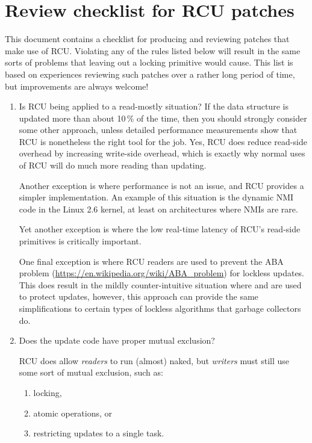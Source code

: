 
\section{Review checklist for RCU patches}

This document contains a checklist for producing and reviewing patches
that make use of RCU\@.
Violating any of the rules listed below will
result in the same sorts of problems that leaving out a locking primitive
would cause.
This list is based on experiences reviewing such patches
over a rather long period of time, but improvements are always welcome!

\begin{enumerate}[start=0]
\item	Is RCU being applied to a read-mostly situation?
	If the data
	structure is updated more than about 10\,\% of the time, then you
	should strongly consider some other approach, unless detailed
	performance measurements show that RCU is nonetheless the right
	tool for the job.
	Yes, RCU does reduce read-side overhead by
	increasing write-side overhead, which is exactly why normal uses
	of RCU will do much more reading than updating.

	Another exception is where performance is not an issue, and RCU
	provides a simpler implementation.
	An example of this situation
	is the dynamic NMI code in the Linux 2.6 kernel, at least on
	architectures where NMIs are rare.

	Yet another exception is where the low real-time latency of RCU's
	read-side primitives is critically important.

	One final exception is where RCU readers are used to prevent
	the ABA problem (\url{https://en.wikipedia.org/wiki/ABA_problem})
	for lockless updates.
	This does result in the mildly
	counter-intuitive situation where  and
	 are used to protect updates, however, this
	approach can provide the same simplifications to certain types
	of lockless algorithms that garbage collectors do.

\item	Does the update code have proper mutual exclusion?

	RCU does allow \emph{readers} to run (almost) naked, but
	\emph{writers} must
	still use some sort of mutual exclusion, such as:

	\begin{enumerate}
	\item	locking,
	\item	atomic operations, or
	\item	restricting updates to a single task.
	\end{enumerate}


\end{enumerate}
